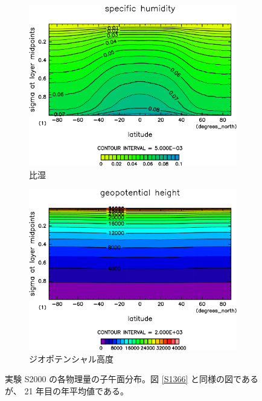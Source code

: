 \documentclass[body]{subfiles}
\begin{document}
\begin{figure}[t]
\begin{subfigure}{.4\textwidth}
		\includegraphics[width=\columnwidth]{S2000/QH2OVap,time=7300:7665-crop-rotate.pdf}
		\caption{比湿\hmu*{[kg/kg]}}\label{S2000比湿}
	\end{subfigure}
	\begin{subfigure}{.4\textwidth}
		\centering
		\includegraphics[width=\columnwidth]{S2000/Height,time=7300:7665-crop-rotate.pdf}
		\caption{ジオポテンシャル高度\hmu*{[m]}}\label{S2000ジオポテンシャル高度}
	\end{subfigure}
	\caption[実験 S2000 の各物理量の子午面分布]{
		実験 S2000 の各物理量の子午面分布。図 \ref{S1366} と同様の図であるが、
		21 年目の年平均値である。
	}\label{S2000}
\end{figure}
\end{document}
